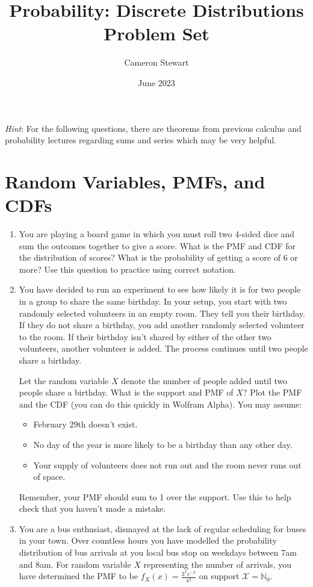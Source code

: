 \documentclass{article}
\title{Probability: Discrete Distributions Problem Set}
\author{Cameron Stewart}
\date{June 2023}
\begin{document}
\maketitle

\textit{Hint}: For the following questions, there are theorems from previous calculus and probability lectures regarding sums and series which may be very helpful.

\section{Random Variables, PMFs, and CDFs}

\begin{enumerate}
    \item You are playing a board game in which you must roll two 4-sided dice and sum the outcomes together to give a score. What is the PMF and CDF for the distribution of scores? What is the probability of getting a score of 6 or more? Use this question to practice using correct notation.
    \item You have decided to run an experiment to see how likely it is for two people in a group to share the same birthday. In your setup, you start with two randomly selected volunteers in an empty room. They tell you their birthday. If they do not share a birthday, you add another randomly selected volunteer to the room. If their birthday isn't shared by either of the other two volunteers, another volunteer is added. The process continues until two people share a birthday.

    Let the random variable \(X\) denote the number of people added until two people share a birthday. What is the support and PMF of \(X\)? Plot the PMF and the CDF (you can do this quickly in Wolfram Alpha). You may assume:
    \begin{itemize}
        \item February 29th doesn't exist.
        \item No day of the year is more likely to be a birthday than any other day.
        \item Your supply of volunteers does not run out and the room never runs out of space. 
    \end{itemize}

    Remember, your PMF should sum to 1 over the support. Use this to help check that you haven't made a mistake.
    \item You are a bus enthusiast, dismayed at the lack of regular scheduling for buses in your town. Over countless hours you have modelled the probability distribution of bus arrivals at you local bus stop on weekdays between 7am and 8am. For random variable \(X\) representing the number of arrivals, you have determined the PMF to be \(f_X\left(x\right) = \frac{3^x e^{-3}}{x!}\) on support \(\mathcal{X} = \mathbb{N}_0\).


\end{enumerate}
\end{document}
